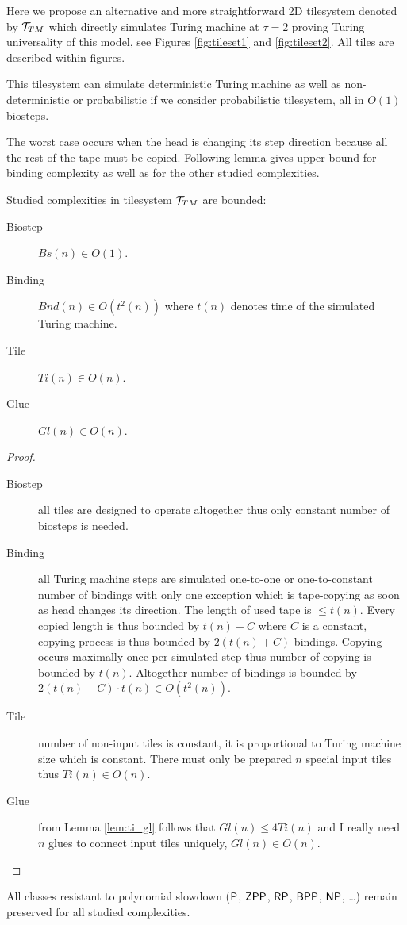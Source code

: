 		Here we propose an alternative and more straightforward 2D tilesystem denoted by ${\cal T}_{TM}$ which directly simulates Turing machine at $\tau=2$ proving Turing universality of this model, see Figures \ref{fig:tileset1} and \ref{fig:tileset2}. All tiles are described within figures.
		\begin{remark}
			This tilesystem can simulate deterministic Turing machine as well as non-deter\-ministic or probabilistic if we consider probabilistic tilesystem, all in $O(1)$ biosteps.
		\end{remark}
		The worst case occurs when the head is changing its step direction because all the rest of the tape must be copied. Following lemma gives upper bound for binding complexity as well as for the other studied complexities.
		\begin{lemma}
		\label{lem:TM_bound}
			Studied complexities in tilesystem ${\cal T}_{TM}$ are bounded:
			\begin{description}
				\item[Biostep] $Bs(n) \in O(1)$.
				\item[Binding] $Bnd(n) \in O(t^2(n))$ where $t(n)$ denotes time of the simulated Turing machine.
				\item[Tile] $Ti(n) \in O(n)$.
				\item[Glue] $Gl(n) \in O(n)$.
			\end{description}
		\end{lemma}
		\begin{proof}
			~
			\begin{description}
				\item[Biostep] all tiles are designed to operate altogether thus only constant number of biosteps is needed.
				\item[Binding] all Turing machine steps are simulated one-to-one or one-to-constant number of bindings with only one exception which is tape-copying as soon as head changes its direction. The length of %
				used tape is $\leq t(n)$. Every copied length is thus bounded by $t(n) + C$ where $C$ is a constant, copying process is thus bounded by $2(t(n)+C)$ bindings. Copying occurs maximally once per simulated step thus number of copying is bounded by $t(n)$. Altogether number of bindings is bounded by $2(t(n)+C)\cdot t(n) \in O(t^2(n))$.
				\item[Tile] number of non-input tiles is constant, it is proportional to Turing machine size which is constant. There must only be prepared $n$ special input tiles thus $Ti(n) \in O(n)$.
				\item[Glue] from Lemma \ref{lem:ti_gl} follows that $Gl(n) \leq 4Ti(n)$ and I really need $n$ glues to connect input tiles uniquely, $Gl(n)\in O(n)$.
			\end{description}
		\end{proof}
		\begin{cor}
		\label{cor:poly_resist}
			All classes resistant to polynomial slowdown ($\P$, $\ZPP$, $\RP$, $\BPP$, $\NP$, \ldots) remain preserved for all studied complexities.
		\end{cor}
		
